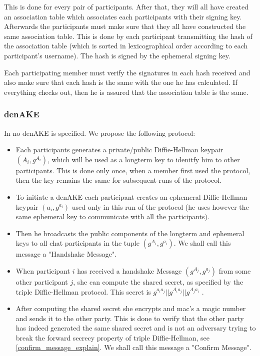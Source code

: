\documentclass[12pt,titlepage,a4paper]{article}
\begin{document}
{This is done for every pair of participants. After that, they will all have
created an association table which associates each participants with their
signing key. Afterwards the participants must make sure that they all have
constructed the same association table. This is done by each participant
transmitting the hash of the association table (which is sorted in
lexicographical order according to each participant's username). The hash
is signed by the ephemeral signing key.

Each participating member must verify the signatures in each hash received and also
make sure that each hash is the same with the one he has calculated. If everything
checks out, then he is assured that the association table is the same.

\subsubsection{denAKE}


In \cite{mpotr} no denAKE is specified. We propose the following protocol:

\begin{itemize}

	\item[] Each participants generates a private/public Diffie-Hellman keypair $(A_i, g^{A_i})$, which
will be used as a longterm key to idenitfy him to other participants. This
is done only once, when a member first used the protocol, then the key remains
the same for subsequent runs of the protocol.

	\item[] To initiate a denAKE each participant creates an ephemeral Diffie-Hellman keypair
		$(a_i,g^{a_i})$ used only in this run of the protocol (he uses however the same ephemeral key
		to communicate with all the participants).

	\item[] Then he broadcasts the public components of the longterm and ephemeral keys to
		all chat participants in the tuple $(g^{A_i}, g^{a_i})$. We shall call this
		message a "Handshake Message".

	\item[] When participant $i$ has received a handshake Message $(g^{A_j}, g^{a_j})$ from some
		other participant $j$, she can compute the shared secret, as specified by the triple
		Diffie-Hellman protocol. This secret is $g^{a_ia_j} || g^{A_ia_j} || g^{A_ja_i}$
		.

	\item[] After computing the shared secret she encrypts and mac's a magic number and sends it
		to the other party. This is done to verify that the other party has indeed generated
		the same shared secret and is not an adversary trying to break the forward secrecy
		property of triple Diffie-Hellman, see \ref{confirm_message_explain}. We shall call
		this message a "Confirm Message".


\end{itemize}}
\end{document}
